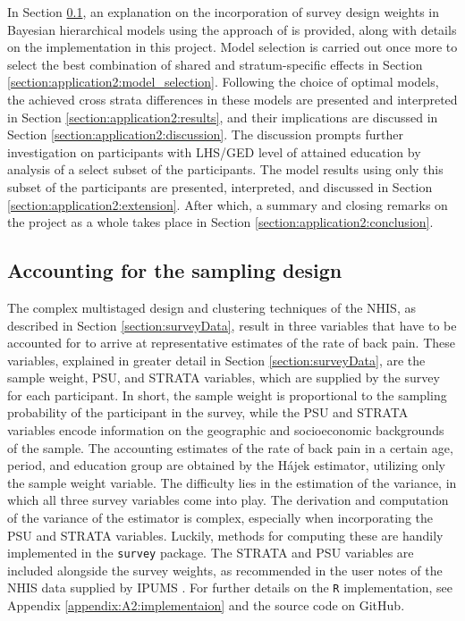In Section \ref{section:application2:sampling_design}, an explanation on the incorporation of survey design weights in Bayesian hierarchical models using the approach of \cite{SurveyDesignMercer} is provided, along with details on the implementation in this project. Model selection is carried out once more to select the best combination of shared and stratum-specific effects in Section \ref{section:application2:model_selection}. Following the choice of optimal models, the achieved cross strata differences in these models are presented and interpreted in Section \ref{section:application2:results}, and their implications are discussed in Section \ref{section:application2:discussion}. The discussion prompts further investigation on participants with LHS/GED level of attained education by analysis of a select subset of the participants. The model results using only this subset of the participants are presented, interpreted, and discussed in Section \ref{section:application2:extension}. After which, a summary and closing remarks on the project as a whole takes place in Section \ref{section:application2:conclusion}.

\subsection{Accounting for the sampling design}
\label{section:application2:sampling_design}
The complex multistaged design and clustering techniques of the NHIS, as described in Section \ref{section:surveyData}, result in three variables that have to be accounted for to arrive at representative estimates of the rate of back pain. These variables, explained in greater detail in Section \ref{section:surveyData}, are the sample weight, PSU, and STRATA variables, which are supplied by the survey for each participant. In short, the sample weight is proportional to the sampling probability of the participant in the survey, while the PSU and STRATA variables encode information on the geographic and socioeconomic backgrounds of the sample. The accounting estimates of the rate of back pain in a certain age, period, and education group are obtained by the Hájek estimator, utilizing only the sample weight variable. The difficulty lies in the estimation of the variance, in which all three survey variables come into play. The derivation and computation of the variance of the estimator is complex, especially when incorporating the PSU and STRATA variables. Luckily, methods for computing these are handily implemented in the \texttt{survey} package. The STRATA and PSU variables are included alongside the survey weights, as recommended in the user notes of the NHIS data supplied by IPUMS \citep{IPUMS}. For further details on the \texttt{R} implementation, see Appendix \ref{appendix:A2:implementaion} and the source code on GitHub.

